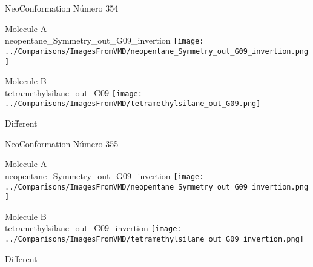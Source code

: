 \vtab[-3cm]
\begin{center}
{\large NeoConformation \tab Número 354}
\end{center}
\begin{multicols}{2}
\begin{center}
Molecule A \\ 
neopentane\_Symmetry\_out\_G09\_invertion
\texttt{[image: ../Comparisons/ImagesFromVMD/neopentane\_Symmetry\_out\_G09\_invertion.png]}
\\
\vtab

\columnbreak
Molecule B \\ 
tetramethylsilane\_out\_G09
\texttt{[image: ../Comparisons/ImagesFromVMD/tetramethylsilane\_out\_G09.png]}
\\
\vtab


\end{center}
\end{multicols}
\begin{center}
\textcolor{NavyBlue}{\Large Different}
\end{center}

 \newpage

\vtab[-3cm]
\begin{center}
{\large NeoConformation \tab Número 355}
\end{center}
\begin{multicols}{2}
\begin{center}
Molecule A \\ 
neopentane\_Symmetry\_out\_G09\_invertion
\texttt{[image: ../Comparisons/ImagesFromVMD/neopentane\_Symmetry\_out\_G09\_invertion.png]}
\\
\vtab

\columnbreak
Molecule B \\ 
tetramethylsilane\_out\_G09\_invertion
\texttt{[image: ../Comparisons/ImagesFromVMD/tetramethylsilane\_out\_G09\_invertion.png]}
\\
\vtab


\end{center}
\end{multicols}
\begin{center}
\textcolor{NavyBlue}{\Large Different}
\end{center}

 \newpage

